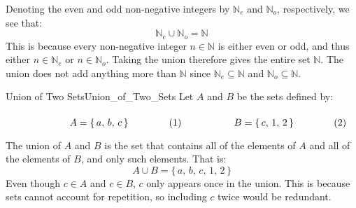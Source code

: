         \begin{example}
            Denoting the even and odd non-negative integers by $\mathbb{N}_{e}$
            and $\mathbb{N}_{o}$, respectively, we see that:
            \begin{equation}
                \mathbb{N}_{e}\cup\mathbb{N}_{o}=\mathbb{N}
            \end{equation}
            This is because every non-negative integer $n\in\mathbb{N}$ is
            either even or odd, and thus either $n\in\mathbb{N}_{e}$ or
            $n\in\mathbb{N}_{o}$. Taking the union therefore gives the entire
            set $\mathbb{N}$. The union does not add anything more than
            $\mathbb{N}$ since $\mathbb{N}_{e}\subseteq\mathbb{N}$ and
            $\mathbb{N}_{o}\subseteq\mathbb{N}$.
        \end{example}
        \begin{fexample}{Union of Two Sets}{Union_of_Two_Sets}
            Let $A$ and $B$ be the sets defined by:
            \par\hfill\par
            \begin{subequations}
                \begin{minipage}[b]{0.49\textwidth}
                    \begin{equation}
                        A=\{\,a,\,b,\,c\,\}
                    \end{equation}
                \end{minipage}
                \hfill
                \begin{minipage}[b]{0.49\textwidth}
                    \begin{equation}
                        B=\{\,c,\,1,\,2\,\}
                    \end{equation}
                \end{minipage}
            \end{subequations}
            \par\vspace{2.5ex}
            The union of $A$ and $B$ is the set that contains all of the
            elements of $A$ and all of the elements of $B$, and only such
            elements. That is:
            \begin{equation}
                A\cup{B}=\{\,a,\,b,\,c,\,1,\,2\,\}
            \end{equation}
            Even though $c\in{A}$ and $c\in{B}$, $c$ only appears once in the
            union. This is because sets cannot account for repetition, so
            including $c$ twice would be redundant.
        \end{fexample}
